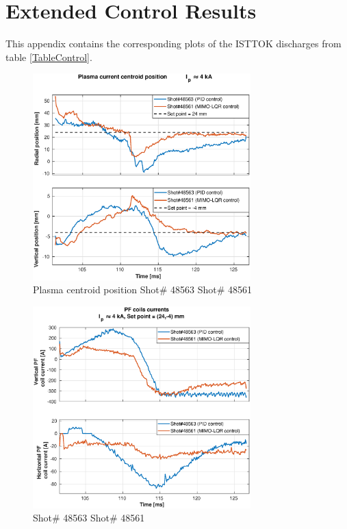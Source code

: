\chapter{Extended Control Results }
\label{Control_Results}
This appendix contains the corresponding plots of the ISTTOK discharges from table \ref{TableControl}.

\begin{figure}[h]
	\centering
	\includegraphics[width=0.75\textwidth]{Chp5/PIDvsMIMO_563_561_2.eps}
	\caption{Plasma centroid position Shot\# 48563 Shot\# 48561}
\end{figure}

\begin{figure}
	\centering
	\includegraphics[width=0.75\textwidth]{Chp5/PIDvsMIMO_563_561_curr_2.eps}
	\caption{  Shot\# 48563 Shot\# 48561}
\end{figure}

